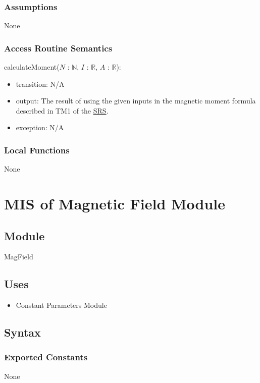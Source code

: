 \documentclass[12pt, titlepage]{article}
\begin{document}
\subsubsection{Assumptions}
None 

\subsubsection{Access Routine Semantics}

\noindent calculateMoment($N$ : $\mathbb{N}$, $I$ : $\mathbb{R}$, $A$ : $\mathbb{R}$):
\begin{itemize}
\item transition: N/A
\item output: The result of using the given inputs in the magnetic moment formula described in TM1 of the \href{https://github.com/husseinsd1/optimal-em-arrangement/blob/main/docs/SRS/SRS.pdf}{SRS}.
\item exception: N/A
\end{itemize}

\subsubsection{Local Functions}
None

\newpage

\section{MIS of Magnetic Field Module} \label{MISMagField}
\subsection{Module}
MagField

\subsection{Uses}
\begin{itemize}
  \item Constant Parameters Module
\end{itemize}

\subsection{Syntax}

\subsubsection{Exported Constants}
None
\end{document}
